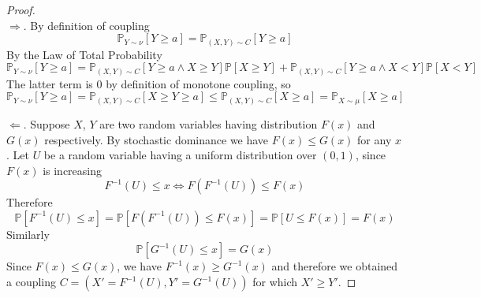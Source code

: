         \begin{proof}
            ~{}\\
            $\Rightarrow$.
            By definition of coupling
            \[ \mathbb{P}_{Y\sim\nu}[Y \ge a] = \mathbb{P}_{(X,Y)\sim C}[Y\ge a] \]
            By the Law of Total Probability
            \[ \mathbb{P}_{Y\sim\nu}[Y \ge a] = \mathbb{P}_{(X,Y)\sim C}[Y \ge a \wedge X \ge Y]\mathbb{P}[X \ge Y] + \mathbb{P}_{(X,Y)\sim C}[Y \ge a \wedge X < Y]\mathbb{P}[X < Y] \]
            The latter term is $0$ by definition of monotone coupling, so
            \[ \mathbb{P}_{Y\sim\nu}[Y \ge a] = \mathbb{P}_{(X,Y)\sim C}[X \ge Y \ge a] \le \mathbb{P}_{(X,Y)\sim C}[X \ge a] = \mathbb{P}_{X\sim\mu}[X \ge a] \]

            $\Leftarrow$. Suppose $X$, $Y$ are two random variables having  distribution $F(x)$ and $G(x)$ respectively. By stochastic dominance we have $F(x) \le G(x)$ for any $x$. Let $U$ be a random variable having a uniform distribution over $(0,1)$, since $F(x)$ is increasing
            \[ F^{-1}(U) \le x \Leftrightarrow F(F^{-1}(U)) \le F(x) \]
            Therefore
            \[ \mathbb{P}[F^{-1}(U) \le x] = \mathbb{P}[F(F^{-1}(U)) \le F(x)] = \mathbb{P}[U \le F(x)] = F(x) \]
            Similarly
            \[ \mathbb{P}[G^{-1}(U) \le x] = G(x) \]
            Since $F(x) \le G(x)$, we have $F^{-1}(x) \ge G^{-1}(x)$ and therefore we obtained a coupling $C = (X' = F^{-1}(U), Y' = G^{-1}(U))$ for which $X' \ge Y'$.
        \end{proof}

